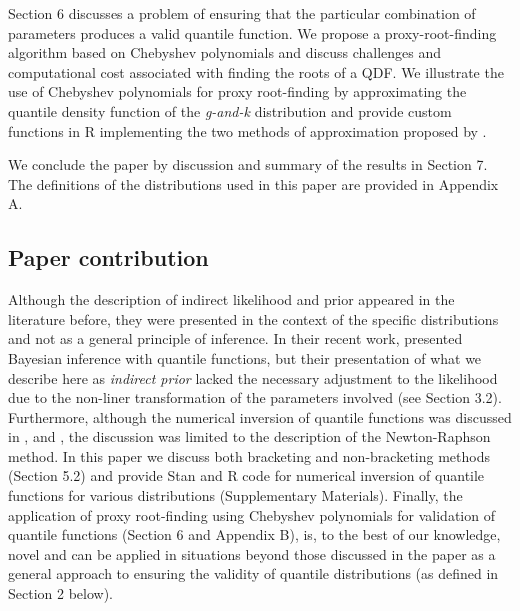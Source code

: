 \documentclass[ba]{imsart}
\numberwithin{equation}{section}
\theoremstyle{plain}
\begin{document}
Section 6 discusses a problem of ensuring that the particular combination of parameters produces a valid quantile function. We propose a proxy-root-finding algorithm based on Chebyshev polynomials and discuss challenges and computational cost associated with finding the roots of a QDF. We illustrate the use of Chebyshev polynomials for proxy root-finding by approximating the quantile density function of the \emph{g-and-k} distribution and provide custom functions in R implementing the two methods of approximation proposed by \citet{boyd2013FindingZerosUnivariate}.

We conclude the paper by discussion and summary of the results in Section 7. The definitions of the distributions used in this paper are provided in Appendix A.

\hypertarget{paper-contribution}{%
\subsection{Paper contribution}\label{paper-contribution}}

Although the description of indirect likelihood \citep{rayner2002NumericalMaximumLikelihood, king1999NewDistributionalFitting} and prior \citep{nair2020BayesianInferenceQuantile} appeared in the literature before, they were presented in the context of the specific distributions and not as a general principle of inference. In their recent work, \citet{nair2020BayesianInferenceQuantile} presented Bayesian inference with quantile functions, but their presentation of what we describe here as \emph{indirect prior} lacked the necessary adjustment to the likelihood due to the non-liner transformation of the parameters involved (see Section 3.2). Furthermore, although the numerical inversion of quantile functions was discussed in \citet{gilchrist2000StatisticalModellingQuantile}, \citet{nair2009QuantileBasedReliabilityAnalysis} and \citet{nair2020BayesianInferenceQuantile}, the discussion was limited to the description of the Newton-Raphson method. In this paper we discuss both bracketing and non-bracketing methods (Section 5.2) and provide Stan and R code for numerical inversion of quantile functions for various distributions (Supplementary Materials). Finally, the application of proxy root-finding using Chebyshev polynomials for validation of quantile functions (Section 6 and Appendix B), is, to the best of our knowledge, novel and can be applied in situations beyond those discussed in the paper as a general approach to ensuring the validity of quantile distributions (as defined in Section 2 below).
\end{document}
